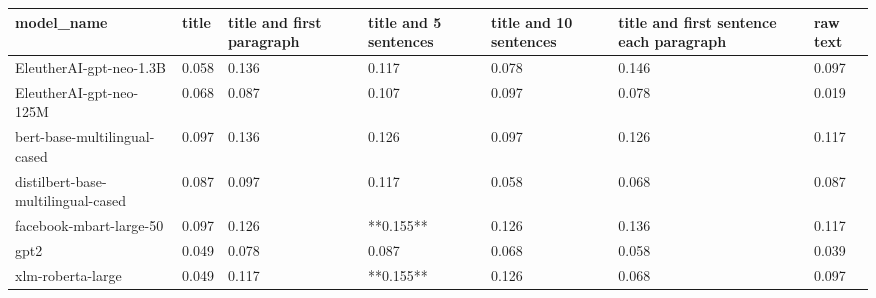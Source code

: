 \begin{tabular}{lllllll}
\toprule
                        model\_name & title & title and first paragraph & title and 5 sentences & title and 10 sentences & title and first sentence each paragraph & raw text \\
\midrule
           EleutherAI-gpt-neo-1.3B & 0.058 &                     0.136 &                 0.117 &                  0.078 &                                   0.146 &    0.097 \\
           EleutherAI-gpt-neo-125M & 0.068 &                     0.087 &                 0.107 &                  0.097 &                                   0.078 &    0.019 \\
      bert-base-multilingual-cased & 0.097 &                     0.136 &                 0.126 &                  0.097 &                                   0.126 &    0.117 \\
distilbert-base-multilingual-cased & 0.087 &                     0.097 &                 0.117 &                  0.058 &                                   0.068 &    0.087 \\
           facebook-mbart-large-50 & 0.097 &                     0.126 &             **0.155** &                  0.126 &                                   0.136 &    0.117 \\
                              gpt2 & 0.049 &                     0.078 &                 0.087 &                  0.068 &                                   0.058 &    0.039 \\
                 xlm-roberta-large & 0.049 &                     0.117 &             **0.155** &                  0.126 &                                   0.068 &    0.097 \\
\bottomrule
\end{tabular}
